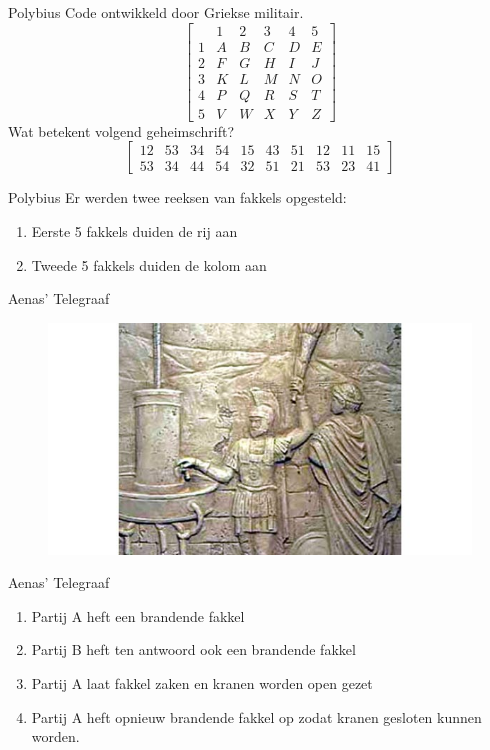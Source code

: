 \documentclass{beamer}
\begin{document}
\begin{frame}{Polybius}
	Code ontwikkeld door Griekse militair.
	\[ \begin{bmatrix}
		& 1  & 2  & 3  & 4 & 5\\ 
		1 & A  & B  &  C & D & E\\ 
		2 & F & G  & H  & I  & J \\ 
		3 & K & L  & M  & N  & O \\ 
		4 & P & Q & R & S  &  T\\ 
		5 & V & W & X & Y & Z  
	\end{bmatrix}  \]
	Wat betekent volgend geheimschrift?
	\[ \begin{bmatrix}
12 & 53 & 34 & 54 & 15 & 43 & 51 & 12 & 11 & 15 \\ 
53 & 34 & 44 & 54 & 32 & 51 & 21 & 53 &23 &41 
\end{bmatrix} \]
\end{frame}

\begin{frame}{Polybius}
	Er werden twee reeksen van fakkels opgesteld:
	\begin{enumerate}
		\item Eerste 5 fakkels duiden de rij aan
		\item Tweede 5 fakkels duiden de kolom aan
	\end{enumerate}
\end{frame}

\begin{frame}{Aenas' Telegraaf}
		\begin{figure}
		\includegraphics[width=\textwidth]{img/aenas.jpg}
	\end{figure}
\end{frame}

\begin{frame}{Aenas' Telegraaf}
	\begin{enumerate}
		\item Partij A heft een brandende fakkel
		\item Partij B heft ten antwoord ook een brandende fakkel
		\item Partij A laat fakkel zaken en kranen worden open gezet
		\item Partij A heft opnieuw brandende fakkel op zodat kranen gesloten kunnen worden.
	\end{enumerate}
\end{frame}
\end{document}
